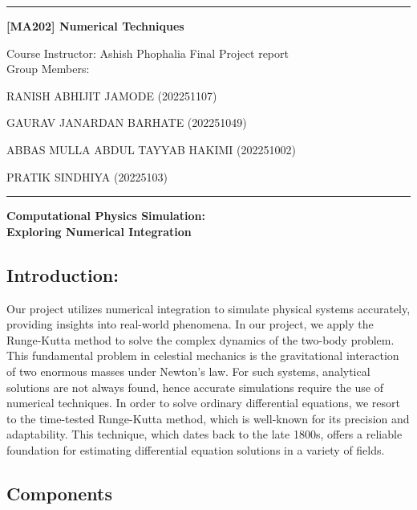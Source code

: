 \documentclass{article}
\begin{document}
\noindent
\rule{\textwidth}{1pt}
\begin{center}
{\bf [MA202] Numerical Techniques}
\end{center}
Course Instructor: Ashish Phophalia 
\hfill Final Project report \\
\hfill Group Members:
    \item RANISH ABHIJIT JAMODE (202251107)
    \item GAURAV JANARDAN BARHATE (202251049)
    \item ABBAS MULLA ABDUL TAYYAB HAKIMI   (202251002)
    \item PRATIK SINDHIYA (20225103)
\\
\rule{\textwidth}{1pt}


\begin{center}
{\LARGE \textbf{Computational Physics Simulation:}} \\[8pt]
{\LARGE \textbf{Exploring Numerical Integration}}
\end{center}


\subsection*{}


\subsection*{Introduction:}
Our project utilizes numerical integration to simulate physical systems accurately, 
providing insights into real-world phenomena. In our project, we apply the Runge-Kutta method to solve the complex dynamics of the two-body problem. This fundamental problem in celestial mechanics is the gravitational interaction of two enormous masses under Newton's law. For such systems, analytical solutions are not always found, hence accurate simulations require the use of numerical techniques. In order to solve ordinary differential equations, we resort to the time-tested Runge-Kutta method, which is well-known for its precision and adaptability. This technique, which dates back to the late 1800s, offers a reliable foundation for estimating differential equation solutions in a variety of fields.

\subsection*{Components}
\end{document}
